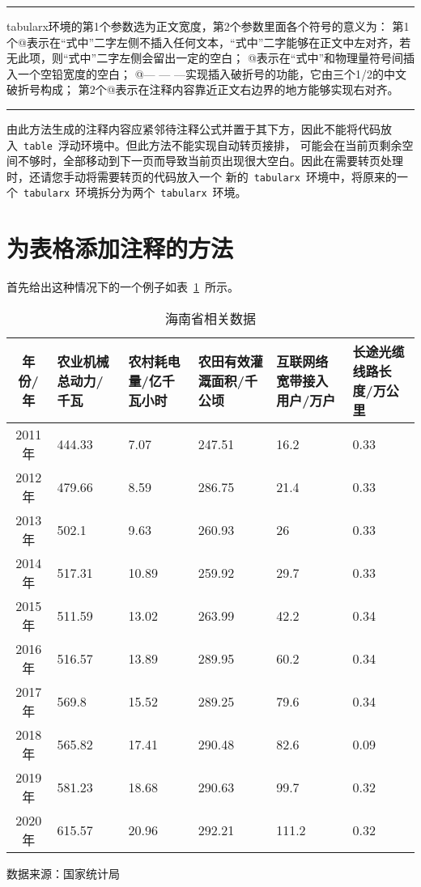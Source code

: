 \noindent\hrule

\begin{VerbWithBreak}
   tabularx环境的第1个参数选为正文宽度，第2个参数里面各个符号的意义为：
   第1个@{}表示在“式中”二字左侧不插入任何文本，“式中”二字能够在正文中左对齐，若无此项，则“式中”二字左侧会留出一定的空白；
   @{\quad}表示在“式中”和物理量符号间插入一个空铅宽度的空白；
   @{— — —}实现插入破折号的功能，它由三个1/2的中文破折号构成；
   第2个@{}表示在注释内容靠近正文右边界的地方能够实现右对齐。
\end{VerbWithBreak}

\noindent\hrule\vspace{1em}

由此方法生成的注释内容应紧邻待注释公式并置于其下方，因此不能将代码放入~\verb|table|~浮动环境中。但此方法不能实现自动转页接排，
可能会在当前页剩余空间不够时，全部移动到下一页而导致当前页出现很大空白。因此在需要转页处理时，还请您手动将需要转页的代码放入一个
新的~\verb|tabularx|~环境中，将原来的一个~\verb|tabularx|~环境拆分为两个~\verb|tabularx|~环境。

\section{为表格添加注释的方法}
首先给出这种情况下的一个例子如表~\ref{tab:table4}~所示。
\begin{table}[!ht]
   \caption{海南省相关数据}\label{tab:table4}
   \vspace{0.5em}\centering\wuhao
   \begin{threeparttable}
   \begin{tabularx}{\textwidth}{c*5{X<{\centering}}}
   \toprule[1.5pt]
   年份/年 & 农业机械总动力/千瓦 & 农村耗电量/亿千瓦小时 & 农田有效灌溉面积/千公顷 & 互联网络宽带接入用户/万户 & 长途光缆线路长度/万公里\\
   \midrule[1pt]
   2011年 & 444.33 & 7.07 & 247.51 & 16.2 & 0.33\\
   2012年 & 479.66 & 8.59 & 286.75 & 21.4 & 0.33\\
   2013年 & 502.1 & 9.63 & 260.93 & 26 & 0.33\\
   2014年 & 517.31 & 10.89 & 259.92 & 29.7 & 0.33\\
   2015年 & 511.59 & 13.02 & 263.99 & 42.2 & 0.34\\
   2016年 & 516.57 & 13.89 & 289.95 & 60.2 & 0.34\\
   2017年 & 569.8 & 15.52 & 289.25 & 79.6 & 0.34\\
   2018年 & 565.82 & 17.41 & 290.48 & 82.6 & 0.09\\
   2019年 & 581.23 & 18.68 & 290.63 & 99.7 & 0.32 \\
   2020年 & 615.57 & 20.96 & 292.21 & 111.2 & 0.32 \\
   \bottomrule[1.5pt]
   \end{tabularx}
   \begin{tablenotes}
       \footnotesize
       \item[1] 数据来源：国家统计局
   \end{tablenotes}
   \end{threeparttable}
   \vspace{\baselineskip}
\end{table}

